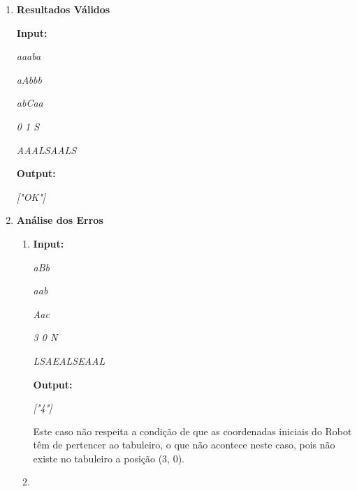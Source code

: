 \documentclass[a4paper, 12pt, portuguese]{article}
\begin{document}
\begin{enumerate}

\vspace{1 mm}

\item\textbf{Resultados Válidos}

\textbf{Input:}

\vspace{2 mm}

\textit{aaaba}

\textit{aAbbb}

\textit{abCaa}

\textit{0 1 S}

\textit{AAALSAALS}

\vspace{2 mm}

\textbf{Output:}

\vspace{2 mm}

\textit{["OK"]}

\vspace{2 mm}

\item\textbf{Análise dos Erros}
\begin{enumerate}

\item

\textbf{Input:}

\vspace{2 mm}

\textit{aBb}

\textit{aab}

\textit{Aac}

\textit{3 0 N}

\textit{LSAEALSEAAL}

\vspace{2 mm}

\textbf{Output:}

\vspace{2 mm}

\textit{["4"]}

\vspace{4 mm}

Este caso não respeita a condição de que as coordenadas iniciais do Robot têm de pertencer ao tabuleiro, o que não acontece neste caso, pois não existe no tabuleiro a posição (3, 0).

\vspace{2 mm}

\item


\end{enumerate}
\end{enumerate}
\end{document}
